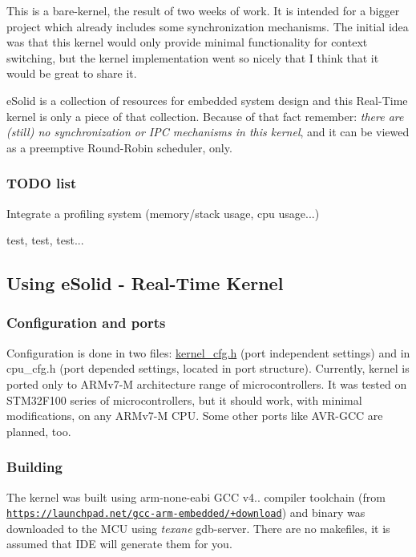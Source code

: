 This is a bare-\/kernel, the result of two weeks of work. It is intended for a bigger project which already includes some synchronization mechanisms. The initial idea was that this kernel would only provide minimal functionality for context switching, but the kernel implementation went so nicely that I think that it would be great to share it.

e\-Solid is a collection of resources for embedded system design and this Real-\/\-Time kernel is only a piece of that collection. Because of that fact remember\-: {\itshape there are (still) no synchronization or I\-P\-C mechanisms in this kernel}, and it can be viewed as a preemptive Round-\/\-Robin scheduler, only.

\subsubsection*{T\-O\-D\-O list}


\begin{DoxyItemize}
\item Integrate a profiling system (memory/stack usage, cpu usage...)
\item test, test, test...
\end{DoxyItemize}

\subsection*{Using e\-Solid -\/ Real-\/\-Time Kernel}

\subsubsection*{Configuration and ports}

Configuration is done in two files\-: {\ttfamily \hyperlink{kernel__cfg_8h}{kernel\-\_\-cfg.\-h}} (port independent settings) and in {\ttfamily cpu\-\_\-cfg.\-h} (port depended settings, located in port structure). Currently, kernel is ported only to A\-R\-Mv7-\/\-M architecture range of microcontrollers. It was tested on S\-T\-M32\-F100 series of microcontrollers, but it should work, with minimal modifications, on any A\-R\-Mv7-\/\-M C\-P\-U. Some other ports like A\-V\-R-\/\-G\-C\-C are planned, too.

\subsubsection*{Building}

The kernel was built using arm-\/none-\/eabi G\-C\-C v4.. compiler toolchain (from \href{https://launchpad.net/gcc-arm-embedded/+download}{\tt https\-://launchpad.\-net/gcc-\/arm-\/embedded/+download}) and binary was downloaded to the M\-C\-U using {\itshape texane} gdb-\/server. There are no makefiles, it is assumed that I\-D\-E will generate them for you.

